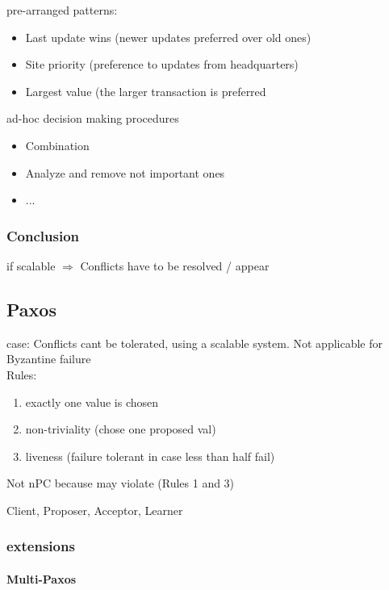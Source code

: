 \documentclass[a4paper,12pt]{article}%
\begin{document}
 pre-arranged patterns:
 \begin{itemize}
 	\item Last update wins (newer updates preferred over old ones)
 	\item  Site priority (preference to updates from headquarters)
 	\item  Largest value (the larger transaction is preferred
 \end{itemize}
 ad-hoc decision making procedures
 \begin{itemize}
 	\item Combination
 	\item Analyze and remove not important ones
 	\item ...
 \end{itemize}
 
 
 
 
 
 
 
 
 
 
 \subsubsection{Conclusion}
 if scalable $\Rightarrow$ Conflicts have to be resolved / appear
 
 \newpage
 \subsection{Paxos}
 case: Conflicts cant be tolerated, using a scalable system. Not applicable for Byzantine failure \\
 Rules:
 \begin{enumerate}
\item exactly one value is chosen
\item non-triviality (chose one proposed val)
\item liveness (failure tolerant in case less than half fail)
 \end{enumerate}
 Not nPC  because may violate (Rules 1 and 3)
 
 Client, Proposer, Acceptor, Learner
 
\subsubsection{extensions}
\paragraph{Multi-Paxos}
\end{document}

